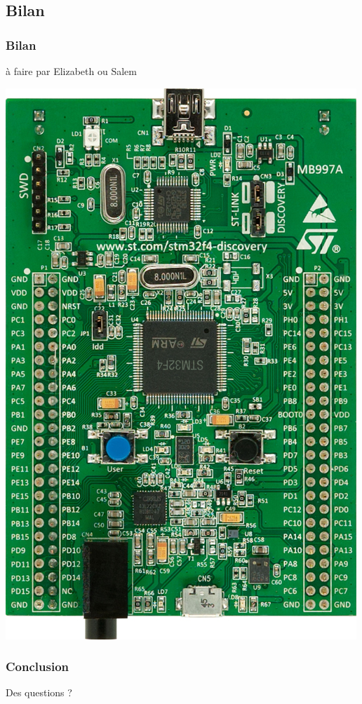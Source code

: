 \documentclass{beamer}
\begin{document}
\subsection{Bilan}
\begin{frame}
\frametitle{Bilan}
à faire par Elizabeth ou Salem
\begin{center}
 \includegraphics[scale=0.1]{../images/stm32f4_discovery.jpg}
\end{center}
\end{frame}

\begin{frame}
\frametitle{Conclusion}
\begin{center}
\huge{Des questions ?}
\end{center}
\end{frame}
\end{document}
